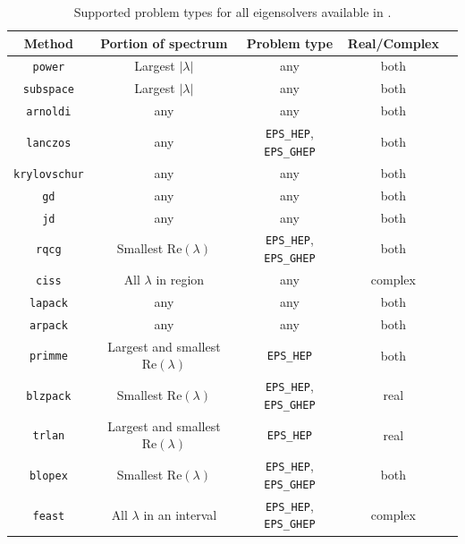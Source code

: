 \begin{table}
\centering
\begin{tabular}{ccccc} \hline
Method   &  Portion of spectrum & Problem type & Real/Complex \\ \hline
\texttt{power}       & Largest $|\lambda|$ & any & both \\ 
\texttt{subspace}    & Largest $|\lambda|$ & any & both \\ 
\texttt{arnoldi}     & any\footnotemark    & any & both\addtocounter{footnote}{-1} \\ 
\texttt{lanczos}     & any\footnotemark    & \Verb!EPS_HEP!, \Verb!EPS_GHEP! & both\addtocounter{footnote}{-1} \\ 
\texttt{krylovschur} & any                 & any & both \\ 
\texttt{gd}          & any\footnotemark    & any & both\addtocounter{footnote}{-1} \\ 
\texttt{jd}          & any\footnotemark    & any & both\addtocounter{footnote}{-1} \\ 
\texttt{rqcg}        & Smallest $\mathrm{Re}(\lambda)$ & \Verb!EPS_HEP!, \Verb!EPS_GHEP! & both \\ 
\texttt{ciss}        & All $\lambda$ in region & any & complex \\ 
\hline
\texttt{lapack}      & any                 & any & both \\ 
\texttt{arpack}      & any\footnotemark    & any & both \\ 
\texttt{primme}      & Largest and smallest $\mathrm{Re}(\lambda)$ & \Verb!EPS_HEP! & both \\ 
\texttt{blzpack}     & Smallest $\mathrm{Re}(\lambda)$ & \Verb!EPS_HEP!, \Verb!EPS_GHEP!  & real \\ 
\texttt{trlan}       & Largest and smallest $\mathrm{Re}(\lambda)$ & \Verb!EPS_HEP! & real \\
\texttt{blopex}      & Smallest $\mathrm{Re}(\lambda)$ & \Verb!EPS_HEP!, \Verb!EPS_GHEP! & both \\
\texttt{feast}       & All $\lambda$ in an interval & \Verb!EPS_HEP!, \Verb!EPS_GHEP! & complex \\ \hline
\end{tabular}
\caption{\label{tab:support}Supported problem types for all eigensolvers available in \slepc.}
\end{table}


